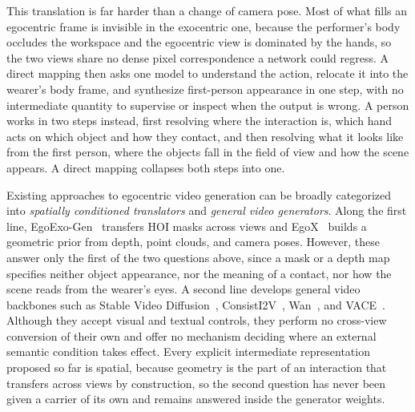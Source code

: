 \documentclass{article}
\begin{document}
This translation is far harder than a change of camera pose. Most of what fills
an egocentric frame is invisible in the exocentric one, because the performer's
body occludes the workspace and the egocentric view is dominated by the hands, so
the two views share no dense pixel correspondence a network could regress. A
direct mapping then asks one model to understand the action, relocate it into the
wearer's body frame, and synthesize first-person appearance in one step, with no
intermediate quantity to supervise or inspect when the output is wrong. A person works in two steps instead,
first resolving where the interaction is, which hand acts on which object and how
they contact, and then resolving what it looks like from the first person, where
the objects fall in the field of view and how the scene appears. A direct mapping
collapses both steps into one.

Existing approaches to egocentric video generation can be broadly categorized
into \emph{spatially conditioned translators} and \emph{general video generators}.
Along the first line, EgoExo-Gen~\citep{xu2025egoexogen} transfers HOI masks
across views and EgoX~\citep{kang2025egox} builds a geometric prior from depth,
point clouds, and camera poses. However, these answer only the first of the two
questions above, since a mask or a depth map specifies neither object appearance,
nor the meaning of a contact, nor how the scene reads from the wearer's eyes. A
second line develops general video backbones such as Stable Video
Diffusion~\citep{blattmann2023svd}, ConsistI2V~\citep{ren2024consisti2v},
Wan~\citep{wan2025}, and VACE~\citep{vace2025}. Although they accept visual and
textual controls, they perform no cross-view conversion of their own and offer no
mechanism deciding where an external semantic condition takes effect. Every explicit intermediate representation proposed so far is
spatial, because geometry is the part of an interaction that transfers across
views by construction, so the second question has never been given a carrier of
its own and remains answered inside the generator weights.
\end{document}
